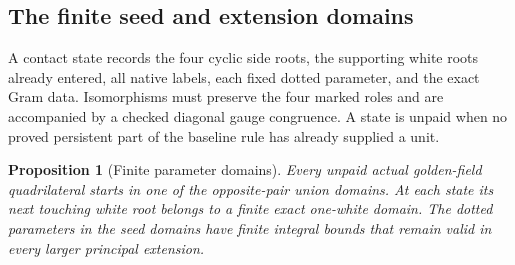 \documentclass[11pt]{article}
\newtheorem{proposition}[theorem]{Proposition}
\begin{document}
\subsection{The finite seed and extension domains}

A contact state records the four cyclic side roots, the supporting
white roots already entered, all native labels, each fixed dotted
parameter, and the exact Gram data. Isomorphisms must preserve the
four marked roles and are accompanied by a checked diagonal gauge
congruence. A state is unpaid when no proved persistent part of the
baseline rule has already supplied a unit.

\begin{proposition}[Finite parameter domains]\label{prop:domains}
Every unpaid actual golden-field quadrilateral starts in one of the
opposite-pair union domains. At each state its next touching white
root belongs to a finite exact one-white domain. The dotted parameters
in the seed domains have finite integral bounds that remain valid in
every larger principal extension.
\end{proposition}
\end{document}
